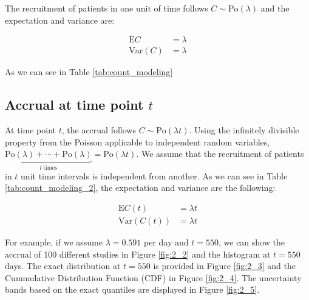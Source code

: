 The recruitment of patients in one unit of time follows $C\sim \textrm{Po} (\lambda)$ and the expectation and variance are:

\begin{align*}
\textrm{E}C & = \lambda \\
\textrm{Var}(C) & = \lambda
\end{align*}

As we can see in Table \ref{tab:count_modeling}

\subsection{Accrual at time point $t$}
At time point $t$, the accrual follows $C\sim \textrm{Po} (\lambda t)$. Using the infinitely divisible property from the Poisson applicable to independent random variables, $\underbrace{\textrm{Po} (\lambda) +\cdots +\textrm{Po} (\lambda)}_{t \ \text{times}} = \textrm{Po} (\lambda t)$. We assume that the recruitment of patients in $t$ unit time intervals is independent from another. As we can see in Table \ref{tab:count_modeling_2}, the expectation and variance are the following:

\begin{align*}
\textrm{E}C(t) & = \lambda t \\
\textrm{Var}(C(t)) & = \lambda t
\end{align*}

For example, if we assume $\lambda = 0.591$ per day and $t=550$, we can show the accrual of 100 different studies in Figure \ref{fig:2_2} and the histogram at $t=550$ days. The exact distribution at $t=550$ is provided in Figure \ref{fig:2_3} and the Cummulative Distribution Function (CDF) in Figure \ref{fig:2_4}. The uncertainty bands based on the exact quantiles are displayed in Figure \ref{fig:2_5}.

